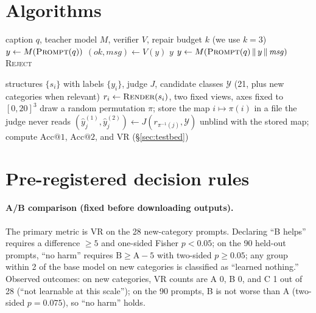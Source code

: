 \documentclass{article}
\begin{document}
\section{Algorithms}
\label{app:algo}
\begin{algorithm}[h]
\caption{Teacher harness: generate, verify, repair (budget $k$)}
\label{alg:harness}
\small\begin{algorithmic}[1]
\Require caption $q$, teacher model $M$, verifier $V$, repair budget $k$ (we use $k=3$)
\State $y \gets M(\textsc{Prompt}(q))$
  \State $(\mathit{ok}, \mathit{msg}) \gets V(y)$ 
   \State \Return $y$ 
  \EndIf
   \State $y \gets M(\textsc{Prompt}(q) \,\|\, y \,\|\, \mathit{msg})$ 
  \EndIf
\EndFor
\State \Return \textsc{Reject}
\end{algorithmic}
\end{algorithm}

\begin{algorithm}[h]
\caption{Blind recognition protocol}
\label{alg:blind}
\small\begin{algorithmic}[1]
\Require structures $\{s_i\}$ with labels $\{y_i\}$, judge $J$, candidate classes $\mathcal Y$ (21, plus new categories when relevant)
 \State $r_i \gets \textsc{Render}(s_i)$, two fixed views, axes fixed to $[0,20]^3$
\EndFor
\State draw a random permutation $\pi$; store the map $i \mapsto \pi(i)$ in a file the judge never reads
 \State $(\hat y^{(1)}_j, \hat y^{(2)}_j) \gets J(r_{\pi^{-1}(j)}, \mathcal Y)$ 
\EndFor
\State unblind with the stored map; compute $\mathrm{Acc@}1$, $\mathrm{Acc@}2$, and VR (\S\ref{sec:testbed})
\end{algorithmic}
\end{algorithm}

\section{Pre-registered decision rules}
\label{app:prereg}
\paragraph{A/B comparison (fixed before downloading outputs).} The primary metric is VR on the 28 new-category prompts. Declaring ``B helps'' requires a difference $\ge 5$ and one-sided Fisher $p<0.05$; on the 90 held-out prompts, ``no harm'' requires $\text{B} \ge \text{A}-5$ with two-sided $p\ge 0.05$; any group within 2 of the base model on new categories is classified as ``learned nothing.'' Observed outcomes: on new categories, VR counts are A 0, B 0, and C 1 out of 28 (``not learnable at this scale''); on the 90 prompts, B is not worse than A (two-sided $p=0.075$), so ``no harm'' holds.
\end{document}
